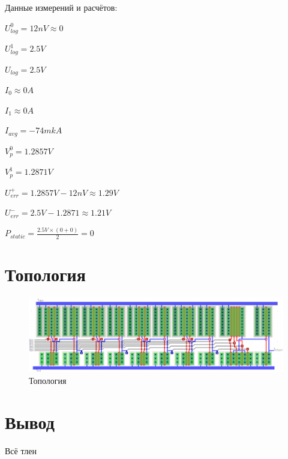 \documentclass[a4paper,14pt]{article}
\begin{document}
Данные измерений и расчётов:

$U_{log}^0 = 12 nV \approx 0$

$U_{log}^1 = 2.5 V$

$U_{log} = 2.5 V$

$I_0 \approx 0 A $

$I_1 \approx 0 A $

$I_{avg} = -74 mkA $

$V_p^0 = 1.2857V$

$V_p^1 = 1.2871V$

$U_{err}^{+} = 1.2857V - 12nV \approx 1.29V $

$U_{err}^{-} = 2.5V - 1.2871 \approx 1.21V $

$P_{static} = \frac{2.5V \times (0 + 0)}{2} = 0$

\section{Топология}

\begin{landscape}
\begin{figure}[H]
	\centering		
	\includegraphics[width=\linewidth]{image/ledit_schema}
	\caption{Топология}\label{img:ledit_schema}
\end{figure}
\end{landscape}

\section{Вывод}

Всё тлен
\end{document}
